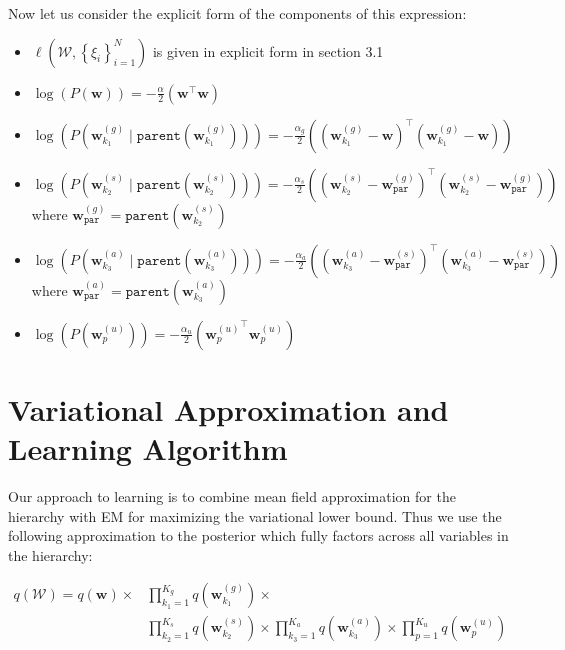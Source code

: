 \documentclass[11pt, a4paper]{article}
\begin{document}
\noindent Now let us consider the explicit form of the components of this expression:
\begin{itemize}
  \item $\ell(\mathcal{W},\left\{\xi_i\right\}_{i=1}^N)$ is given in explicit form in section 3.1
  \item $\log\left(P(\textbf{w})\right)=-\frac{\alpha}{2}\left(\textbf{w}^\top\textbf{w}\right)$
  \item $\log\left(P\left(\textbf{w}^{(g)}_{k_1} \mid \texttt{parent}(\textbf{w}^{(g)}_{k_1})\right)\right)=-\frac{\alpha_g}{2}\left(\left(\textbf{w}^{(g)}_{k_1}-\textbf{w}\right)^\top\left(\textbf{w}^{(g)}_{k_1}-\textbf{w}\right)\right)$
  \item $\log\left(P\left(\textbf{w}^{(s)}_{k_2} \mid \texttt{parent}(\textbf{w}^{(s)}_{k_2})\right)\right)=-\frac{\alpha_s}{2}\left(\left(\textbf{w}^{(s)}_{k_2}-\textbf{w}^{(g)}_{\texttt{par}}\right)^\top\left(\textbf{w}^{(s)}_{k_2}-\textbf{w}^{(g)}_{\texttt{par}}\right)\right)$\\
      where  $\textbf{w}^{(g)}_{\texttt{par}}=\texttt{parent}(\textbf{w}^{(s)}_{k_2})$
   \item $\log\left(P\left(\textbf{w}^{(a)}_{k_3} \mid \texttt{parent}(\textbf{w}^{(a)}_{k_3})\right)\right)=-\frac{\alpha_a}{2}\left(\left(\textbf{w}^{(a)}_{k_3}-\textbf{w}^{(s)}_{\texttt{par}}\right)^\top\left(\textbf{w}^{(a)}_{k_3}-\textbf{w}^{(s)}_{\texttt{par}}\right)\right)$\\
      where  $\textbf{w}^{(a)}_{\texttt{par}}=\texttt{parent}(\textbf{w}^{(a)}_{k_3})$
   \item $\log\left(P\left(\textbf{w}^{(u)}_{p} \right)\right)=-\frac{\alpha_u}{2}\left({\textbf{w}^{(u)}_{p}}^\top\textbf{w}^{(u)}_{p} \right)$
\end{itemize}

\section{Variational Approximation and Learning Algorithm}

\noindent Our approach to learning is to combine mean field approximation for the hierarchy with EM for maximizing the variational lower bound. Thus we use the following approximation to the posterior which fully factors across all variables in the hierarchy:

\begin{align*}
q(\mathcal{W})
=q(\textbf{w}) \times &\prod_{k_1=1}^{K_g}q\left(\textbf{w}^{(g)}_{k_1}\right)\times\\
&\prod_{k_2=1}^{K_s}q\left(\textbf{w}^{(s)}_{k_2} \right)\times \prod_{k_3=1}^{K_a}q\left(\textbf{w}^{(a)}_{k_3}\right)\times\prod_{p=1}^{K_u}q\left(\textbf{w}^{(u)}_{p} \right)
\end{align*}
\end{document}
